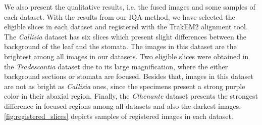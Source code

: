 We also present the qualitative results, i.e. the fused images and some samples of each dataset. With the results from our IQA method, we have selected the eligible slices in each dataset and registered with the TrakEM2 alignment tool. The \textit{Callisia} dataset has six slices which present slight differences between the background of the leaf and the stomata. The images in this dataset are the brightest among all images in our datasets. Two eligible slices were obtained in the \textit{Tradescantia} dataset due to its large magnification, where the either background sections or stomata are focused. Besides that, images in this dataset are not as bright as \textit{Callisia} ones, since the specimens present a strong purple color in their abaxial region. Finally, the \textit{Cthenante} dataset presents the strongest difference in focused regions among all datasets and also the darkest images. \autoref{fig:registered_slices} depicts samples of registered images in each dataset. 

